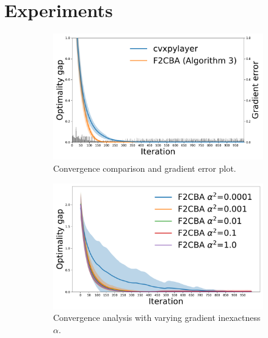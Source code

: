 \section{Experiments}

\begin{figure}
    \centering
    \begin{subfigure}[b]{0.32\textwidth}
        \centering
        \includegraphics[width=\textwidth]{src/figures/ydim200_loss.pdf}
        \caption{Convergence comparison and gradient error plot.}
        \label{fig:convergence-comparison}
    \end{subfigure}
    \hfill
    \begin{subfigure}[b]{0.32\textwidth}
        \centering
        \includegraphics[width=\textwidth]{src/figures/ydim200_gradient_error.pdf}
        \caption{Convergence analysis with varying gradient inexactness $\alpha$.}
        \label{fig:convergence-comparison-2}
    \end{subfigure}
    \hfill
    \begin{subfigure}[b]{0.32\textwidth}

\end{subfigure}
\end{figure}
